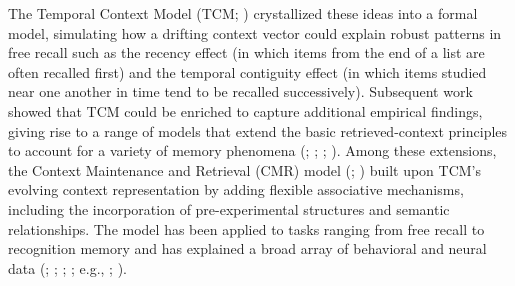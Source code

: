 \documentclass[
  man,
  floatsintext,
  longtable,
  nolmodern,
  notxfonts,
  notimes,
  draftfirst,
  colorlinks=true,linkcolor=blue,citecolor=blue,urlcolor=blue]{apa7}
\begin{document}
The Temporal Context Model (TCM;
)
crystallized these ideas into a formal model, simulating how a drifting
context vector could explain robust patterns in free recall such as the
recency effect (in which items from the end of a list are often recalled
first) and the temporal contiguity effect (in which items studied near
one another in time tend to be recalled successively). Subsequent work
showed that TCM could be enriched to capture additional empirical
findings, giving rise to a range of models that extend the basic
retrieved-context principles to account for a variety of memory
phenomena (;
;
;
). Among
these extensions, the Context Maintenance and Retrieval (CMR) model
(;
) built upon TCM's
evolving context representation by adding flexible associative
mechanisms, including the incorporation of pre-experimental structures
and semantic relationships. The model has been applied to tasks ranging
from free recall to recognition memory and has explained a broad array
of behavioral and neural data (; ;
;
; e.g.,
;
).
\end{document}
